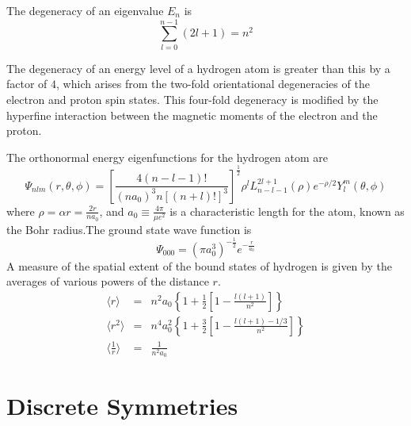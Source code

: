 The degeneracy of an eigenvalue $E_n$ is
\[\sum_{l=0}^{n-1} (2l+1) = n^2\]
\begin{note}
The degeneracy of an energy level of a hydrogen atom is greater than this by a factor of $4$, which arises from the two-fold orientational degeneracies of the electron and proton spin states. This four-fold degeneracy is modified by the hyperfine interaction between the magnetic moments of the electron and the proton.
\end{note}
\noindent
The orthonormal energy eigenfunctions for the hydrogen atom are
\[\Psi_{nlm}(r,\theta,\phi) =  \left[ \frac{4(n-l-1)!}{(na_0)^3 n[(n+l)!]^3} \right]^{\frac{1}{2}} \rho^l L_{n-l-1}^{2l+1}(\rho) e^{-\rho/2} Y_l^m (\theta,\phi)\]
where $\rho = \alpha r = \frac{2r}{na_0}$, and $a_0 \equiv \frac{4\pi}{\mu e^2}$ is a characteristic length for the
atom, known as the Bohr radius.The ground state wave
function is
\[\Psi_{000} = (\pi a_0^3)^{-\frac{1}{2}} e^{-\frac{r}{a_0}}\]
A measure of the spatial extent of the bound states of hydrogen is given by the averages of various powers of the distance $r$.
\begin{eqnarray}
\langle r \rangle &=& n^2a_0 \left \{ 1 + \frac{1}{2} \left [ 1 - \frac{l(l+1)}{n^2} \right] \right\} \nonumber \\
\langle r^2 \rangle &=& n^4a_0^2 \left \{ 1 + \frac{3}{2} \left [ 1 - \frac{l(l+1)-1/3}{n^2} \right] \right\} \nonumber \\
\langle \frac{1}{r} \rangle &=& \frac{1}{n^2 a_0} \nonumber
\end{eqnarray}

\chapter{Discrete Symmetries}
